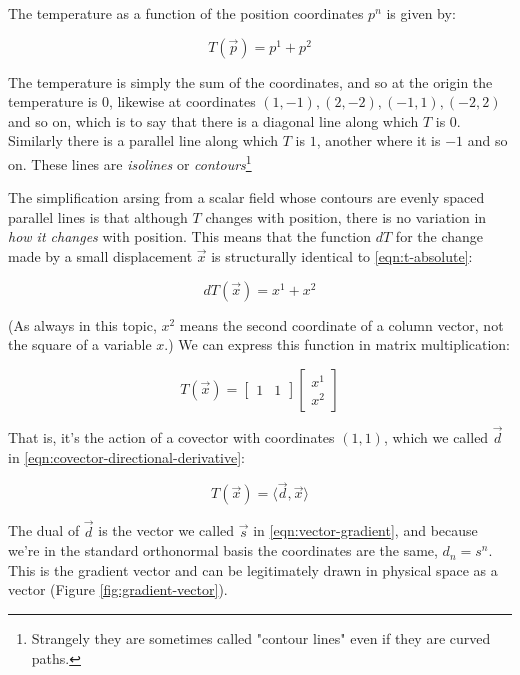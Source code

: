 The temperature as a function of the position coordinates $p^n$ is given by:

\begin{equation}
    T(\vec{p}) = p^1 + p^2
    \label{eqn:t-absolute}
\end{equation}

The temperature is simply the sum of the coordinates, and so at the origin the temperature is $0$, likewise at coordinates $(1, -1), (2, -2), (-1, 1), (-2, 2)$ and so on, which is to say that there is a diagonal line along which $T$ is $0$. Similarly there is a parallel line along which $T$ is $1$, another where it is $-1$ and so on. These lines are \textit{isolines} or \textit{contours}\footnote{Strangely they are sometimes called "contour lines" even if they are curved paths.}

The simplification arsing from a scalar field whose contours are evenly spaced parallel lines is that although $T$ changes with position, there is no variation in \textit{how it changes} with position. This means that the function $dT$ for the change made by a small displacement $\vec{x}$ is structurally identical to \eqref{eqn:t-absolute}:

\begin{equation}
    dT(\vec{x}) = x^1 + x^2
    \label{eqn:t-rel}
\end{equation}

(As always in this topic, $x^2$ means the second coordinate of a column vector, not the square of a variable $x$.) We can express this function in matrix multiplication:

\begin{equation}
    T(\vec{x}) = 
    \begin{bmatrix}1 & 1\end{bmatrix}
    \begin{bmatrix}x^1 \\ x^2\end{bmatrix}
    \label{eqn:t-rel-matrices}
\end{equation}

That is, it's the action of a covector with coordinates $(1, 1)$, which we called $\vec{d}$ in \eqref{eqn:covector-directional-derivative}:

$$
T(\vec{x}) = \langle \vec{d}, \vec{x} \rangle
$$

The dual of $\vec{d}$ is the vector we called $\vec{s}$ in \eqref{eqn:vector-gradient}, and because we're in the standard orthonormal basis the coordinates are the same, $d_n = s^n$. This is the gradient vector and can be legitimately drawn in physical space as a vector (Figure \ref{fig:gradient-vector}).

